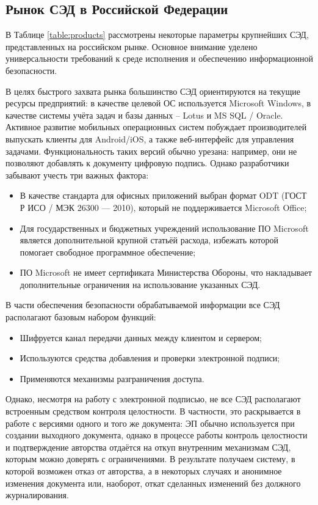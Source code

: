 \subsection{Рынок СЭД в Российской Федерации} \label{review_products}

В Таблице \ref{table:products} рассмотрены некоторые параметры крупнейших СЭД, представленных на российском рынке. Основное внимание уделено универсальности требований к среде исполнения и обеспечению информационной безопасности.

\vspace{\baselineskip}
В целях быстрого захвата рынка большинство СЭД ориентируются на текущие ресурсы предприятий: в качестве целевой ОС используется Microsoft Windows, в качестве системы учёта задач и базы данных – Lotus и MS SQL / Oracle. Активное развитие мобильных операционных систем побуждает производителей выпускать клиенты для Android/iOS, а также веб-интерфейс для управления задачами. Функциональность таких версий обычно урезана: например, они не позволяют добавлять к документу цифровую подпись. Однако разработчики забывают учесть три важных фактора:
\begin{itemize}
	\item В качестве стандарта для офисных приложений выбран формат ODT (ГОСТ Р ИСО / МЭК 26300 --- 2010), который не поддерживается Microsoft Office;
	\item Для государственных и бюджетных учреждений использование ПО Microsoft является дополнительной крупной статьёй расхода, избежать которой помогает свободное программное обеспечение;
	\item ПО Microsoft не имеет сертификата Министерства Обороны, что накладывает дополнительные ограничения на использование указанных СЭД.
\end{itemize}

В части обеспечения безопасности обрабатываемой информации все СЭД располагают базовым набором функций:
\begin{itemize}
	\item Шифруется канал передачи данных между клиентом и сервером;
	\item Используются средства добавления и проверки электронной подписи;
	\item Применяются механизмы разграничения доступа.
\end{itemize}

Однако, несмотря на работу с электронной подписью, не все СЭД располагают встроенным средством контроля целостности. В частности, это раскрывается в работе с версиями одного и того же документа: ЭП обычно используется при создании выходного документа, однако в процессе работы контроль целостности и подтверждение авторства отдаётся на откуп внутренним механизмам СЭД, которым можно доверять с ограничениями. В результате получаем систему, в которой возможен отказ от авторства, а в некоторых случаях и анонимное изменения документа или, наоборот, откат сделанных изменений без должного журналирования.

